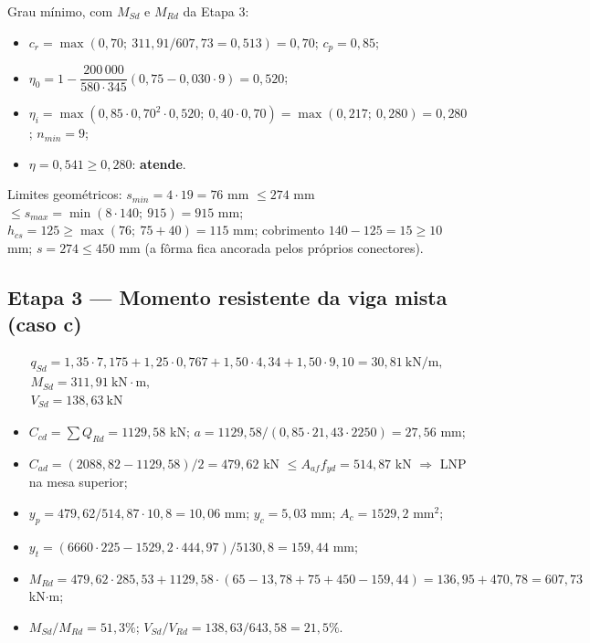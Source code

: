 Grau mínimo, com $M_{Sd}$ e $M_{Rd}$ da Etapa 3:
\begin{itemize}
\item $c_r = \max(0{,}70;\ 311{,}91/607{,}73 = 0{,}513) = 0{,}70$; $c_p = 0{,}85$;
\item $\eta_0 = 1 - \dfrac{200\,000}{580 \cdot 345}(0{,}75 - 0{,}030 \cdot 9) = 0{,}520$;
\item $\eta_i = \max(0{,}85 \cdot 0{,}70^2 \cdot 0{,}520;\ 0{,}40 \cdot 0{,}70) = \max(0{,}217;\ 0{,}280) = 0{,}280$; $n_{min} = 9$;
\item $\eta = 0{,}541 \ge 0{,}280$: \textbf{atende}.
\end{itemize}

Limites geométricos: $s_{min} = 4 \cdot 19 = 76$ mm $\le 274$ mm $\le s_{max} = \min(8 \cdot 140;\ 915) = 915$ mm; $h_{cs} = 125 \ge \max(76;\ 75 + 40) = 115$ mm; cobrimento $140 - 125 = 15 \ge 10$ mm; $s = 274 \le 450$ mm (a fôrma fica ancorada pelos próprios conectores).

\subsection{Etapa 3 --- Momento resistente da viga mista (caso c)}
\begin{gather*}
  q_{Sd} = 1{,}35 \cdot 7{,}175 + 1{,}25 \cdot 0{,}767 + 1{,}50 \cdot 4{,}34 + 1{,}50 \cdot 9{,}10 = 30{,}81\ \text{kN/m}, \\
  M_{Sd} = 311{,}91\ \text{kN}\cdot\text{m}, \\
  V_{Sd} = 138{,}63\ \text{kN}
\end{gather*}

\begin{itemize}
\item $C_{cd} = \sum Q_{Rd} = 1129{,}58$ kN; $a = 1129{,}58/(0{,}85 \cdot 21{,}43 \cdot 2250) = 27{,}56$ mm;
\item $C_{ad} = (2088{,}82 - 1129{,}58)/2 = 479{,}62$ kN $\le A_{af} f_{yd} = 514{,}87$ kN \ensuremath{\Rightarrow} LNP na mesa superior;
\item $y_p = 479{,}62/514{,}87 \cdot 10{,}8 = 10{,}06$ mm; $y_c = 5{,}03$ mm; $A_c = 1529{,}2$ mm\ensuremath{^2};
\item $y_t = (6660 \cdot 225 - 1529{,}2 \cdot 444{,}97)/5130{,}8 = 159{,}44$ mm;
\item $M_{Rd} = 479{,}62 \cdot 285{,}53 + 1129{,}58 \cdot (65 - 13{,}78 + 75 + 450 - 159{,}44) = 136{,}95 + 470{,}78 = 607{,}73$ kN\ensuremath{\cdot}m;
\item $M_{Sd}/M_{Rd} = 51{,}3\%$; $V_{Sd}/V_{Rd} = 138{,}63/643{,}58 = 21{,}5\%$.
\end{itemize}

